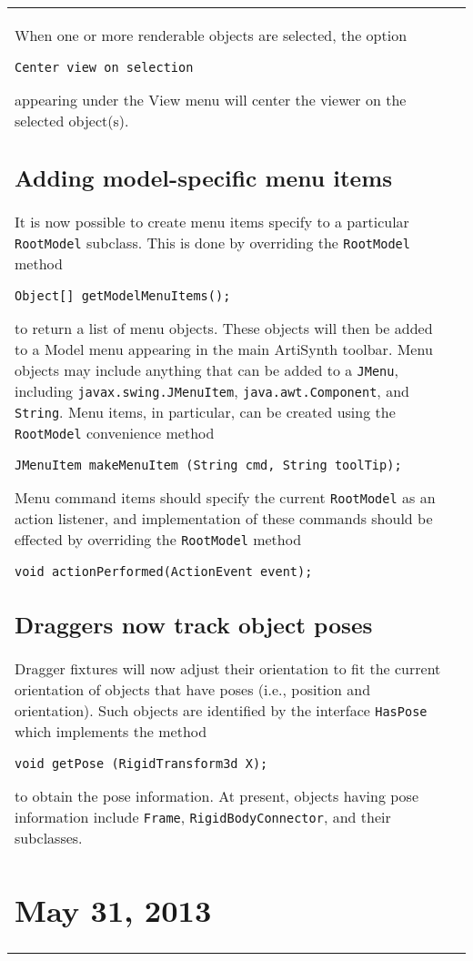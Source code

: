 \documentclass{article}
\begin{document}
\begin{tabular}{ll}
When one or more renderable objects are selected, the option
\begin{verbatim}
Center view on selection
\end{verbatim}
appearing under the {\sf View} menu will center the viewer 
on the selected object(s).

\subsection*{Adding model-specific menu items}

It is now possible to create menu items specify to a particular {\tt
RootModel} subclass. This is done by overriding the {\tt RootModel}
method
\begin{verbatim}
Object[] getModelMenuItems();
\end{verbatim}
to return a list of menu objects. These objects will then be added to
a {\sf Model} menu appearing in the main ArtiSynth toolbar. Menu
objects may include anything that can be added to a {\tt JMenu},
including {\tt javax.swing.JMenuItem}, {\tt java.awt.Component}, and
{\tt String}. Menu items, in particular, can be created using the
{\tt RootModel} convenience method
\begin{verbatim}
JMenuItem makeMenuItem (String cmd, String toolTip);
\end{verbatim}
Menu command items should specify the current {\tt RootModel} as an
action listener, and implementation of these commands should be
effected by overriding the {\tt RootModel} method
\begin{verbatim}
void actionPerformed(ActionEvent event);
\end{verbatim}

\subsection*{Draggers now track object poses}

Dragger fixtures will now adjust their orientation to fit the current
orientation of objects that have poses (i.e., position and
orientation). Such objects are identified by the interface {\tt HasPose}
which implements the method
\begin{verbatim}
void getPose (RigidTransform3d X);
\end{verbatim}
to obtain the pose information. At present, objects having pose
information include {\tt Frame}, {\tt RigidBodyConnector}, and their
subclasses.

\section*{May 31, 2013}


\end{tabular}
\end{document}
